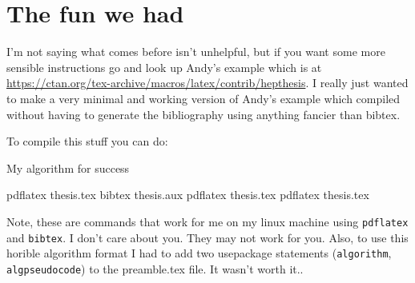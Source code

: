 \chapter{The fun we had}
\label{chap:TheFunWeHad}

I'm not saying what comes before isn't unhelpful, but if you want some more sensible instructions go and look up Andy's example which is at \href{https://ctan.org/tex-archive/macros/latex/contrib/hepthesis}{https://ctan.org/tex-archive/macros/latex/contrib/hepthesis}.
I really just wanted to make a very minimal and working version of Andy's example which compiled without having to generate the bibliography using anything fancier than bibtex.

To compile this stuff you can do:

\begin{algorithm}[H]
\caption{My algorithm for success}\label{euclid}
\begin{algorithmic}[1]
\State pdflatex thesis.tex
\State bibtex thesis.aux
\State pdflatex thesis.tex
\State pdflatex thesis.tex
\EndProcedure
\end{algorithmic}
\end{algorithm}

Note, these are commands that work for me on my linux machine using \texttt{pdflatex} and \texttt{bibtex}. I don't care about you. They may not work for you. Also, to use this horible algorithm format I had to add two usepackage statements (\texttt{algorithm}, \texttt{algpseudocode}) to the preamble.tex file. It wasn't worth it..
